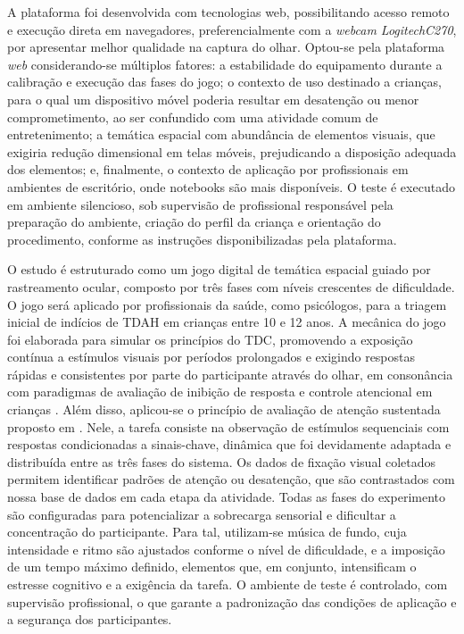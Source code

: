 \documentclass[11pt,a4paper]{article}
\begin{document}
A plataforma foi desenvolvida com tecnologias web, possibilitando acesso remoto e execução direta em navegadores, preferencialmente com a \textit{webcam LogitechC270}, por apresentar melhor qualidade na captura do olhar. Optou-se pela plataforma \textit{web} considerando-se múltiplos fatores: a estabilidade do equipamento durante a calibração e execução das fases do jogo; o contexto de uso destinado a crianças, para o qual um dispositivo móvel poderia resultar em desatenção ou menor comprometimento, ao ser confundido com uma atividade comum de entretenimento; a temática espacial com abundância de elementos visuais, que exigiria redução dimensional em telas móveis, prejudicando a disposição adequada dos elementos; e, finalmente, o contexto de aplicação por profissionais em ambientes de escritório, onde notebooks são mais disponíveis. O teste é executado em ambiente silencioso, sob supervisão de profissional responsável pela preparação do ambiente, criação do perfil da criança e orientação do procedimento, conforme as instruções disponibilizadas pela plataforma. 

O estudo é estruturado como um jogo digital de temática espacial guiado por rastreamento ocular, composto por três fases com níveis crescentes de dificuldade. O jogo será aplicado por profissionais da saúde, como psicólogos, para a triagem inicial de indícios de TDAH em crianças entre 10 e 12 anos. A mecânica do jogo foi elaborada para simular os princípios do TDC, promovendo a exposição contínua a estímulos visuais por períodos prolongados e exigindo respostas rápidas e consistentes por parte do participante através do olhar, em consonância com paradigmas de avaliação de inibição de resposta e controle atencional em crianças \cite{HOYNIAK2019200}. Além disso, aplicou-se o princípio de avaliação de atenção sustentada proposto em \cite{sciencedirect_cpt}. Nele, a tarefa consiste na observação de estímulos sequenciais com respostas condicionadas a sinais-chave, dinâmica que foi devidamente adaptada e distribuída entre as três fases do sistema. Os dados de fixação visual coletados permitem identificar padrões de atenção ou desatenção, que são contrastados com nossa base de dados em cada etapa da atividade. Todas as fases do experimento são configuradas para potencializar a sobrecarga sensorial e dificultar a concentração do participante. Para tal, utilizam-se música de fundo, cuja intensidade e ritmo são ajustados conforme o nível de dificuldade, e a imposição de um tempo máximo definido, elementos que, em conjunto, intensificam o estresse cognitivo e a exigência da tarefa. O ambiente de teste é controlado, com supervisão profissional, o que garante a padronização das condições de aplicação e a segurança dos participantes. 
\end{document}
